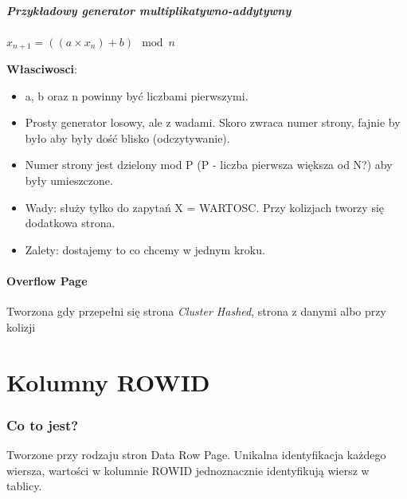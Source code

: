 \documentclass[a4paper,twoside]{article}
\begin{document}
  		\subsubsection*{Przykładowy generator multiplikatywno-addytywny}
  		\centerline{\(x_{n+1} = ((a\times x_{n}) + b) \mod n\)}
  		\textbf{Własciwosci}:
  		\begin{itemize}
  			\item a, b oraz n powinny być liczbami pierwszymi.
  			\item Prosty generator losowy, ale z wadami. Skoro zwraca numer strony, fajnie by było aby były dość blisko (odczytywanie).
  			\item Numer strony jest dzielony mod P (P - liczba pierwsza większa od N?) aby były umieszczone.
  			\item Wady: służy tylko do zapytań X = WARTOSC. Przy kolizjach tworzy się dodatkowa strona.
  			\item Zalety: dostajemy to co chcemy w jednym kroku.
  		\end{itemize}
  	
  		\subsection*{Overflow Page}
  		Tworzona gdy przepełni się strona \textit{Cluster Hashed}, strona z danymi albo przy kolizji
  		
  	\part*{Kolumny ROWID}
  	\section*{Co to jest?}
  	Tworzone przy rodzaju stron Data Row Page. Unikalna identyfikacja każdego wiersza, wartości w kolumnie ROWID jednoznacznie identyfikują wiersz w tablicy.
\end{document}
